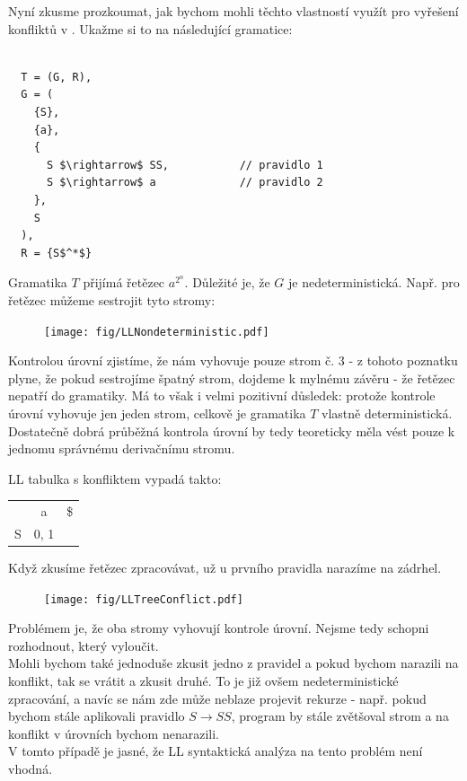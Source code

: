 Nyní zkusme prozkoumat, jak bychom mohli těchto vlastností využít pro
vyřešení konfliktů v . Ukažme si to na následující gramatice:
\begin{exmp}
  \label{exmp:aa}
  \begin{lstlisting}

  T = (G, R),
  G = (
    {S},
    {a},
    {
      S $\rightarrow$ SS,           // pravidlo 1
      S $\rightarrow$ a             // pravidlo 2
    },
    S
  ),
  R = {S$^*$}
  \end{lstlisting}
  Gramatika $T$ přijímá řetězec $a^{2^n}$. Důležité je, že
   $G$ je
  nedeterministická. Např. pro řetězec  můžeme sestrojit
  tyto stromy:

  \begin{figure}[H]
    \centering
    \texttt{[image: fig/LLNondeterministic.pdf]}
  \end{figure}
  Kontrolou úrovní zjistíme, že nám vyhovuje pouze strom č. 3 - z tohoto
  poznatku plyne, že pokud sestrojíme špatný strom, dojdeme k mylnému závěru
  - že řetězec nepatří do gramatiky. Má to však i velmi pozitivní důsledek:
  protože kontrole úrovní vyhovuje jen jeden strom, celkově je gramatika $T$ vlastně
  deterministická. Dostatečně dobrá průběžná kontrola úrovní by tedy teoreticky
  měla vést pouze k jednomu správnému derivačnímu stromu.

  LL tabulka s konfliktem vypadá takto:
  \begin{table}[H]
    \centering
    \begin{tabular}{| c || c | c |}
      \hline
        & a & \$  \\
      \hhline{|=||=|=|}
      S & 0, 1 &  \\
      \hline
    \end{tabular}
  \end{table}

  Když zkusíme řetězec zpracovávat, už u prvního pravidla narazíme na zádrhel.

  \begin{figure}[H]
    \centering
    \texttt{[image: fig/LLTreeConflict.pdf]}
  \end{figure}

  Problémem je, že oba stromy vyhovují kontrole úrovní.
  Nejsme tedy schopni rozhodnout, který vyloučit.\\

  Mohli bychom také jednoduše zkusit jedno z pravidel a pokud bychom narazili na
  konflikt, tak se vrátit a zkusit druhé. To je již ovšem nedeterministické
  zpracování, a navíc se nám zde může neblaze projevit rekurze - např. pokud bychom
  stále aplikovali pravidlo $S \rightarrow SS$, program by stále zvětšoval strom
  a na konflikt v úrovních bychom nenarazili.\\
  V tomto případě je jasné, že LL syntaktická analýza na tento problém
  není vhodná.

\end{exmp}

